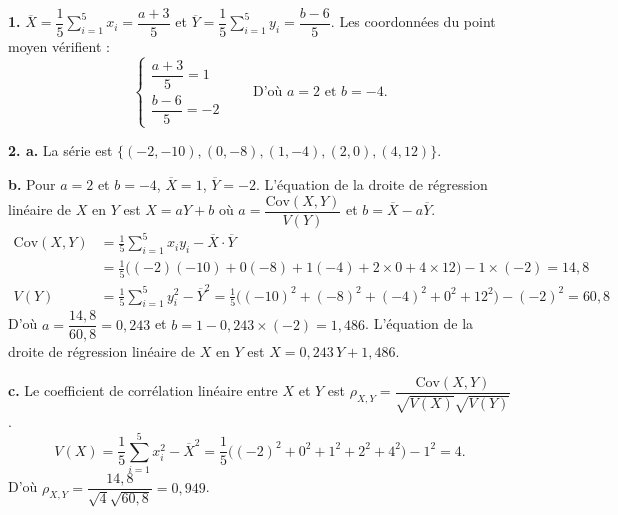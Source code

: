 \documentclass[11pt]{article}
\begin{document}


\textbf{1.} $\overline{X} = \dfrac{1}{5}\displaystyle\sum_{i=1}^5 x_i = \dfrac{a + 3}{5}$ et $\overline{Y} = \dfrac{1}{5}\displaystyle\sum_{i=1}^5 y_i = \dfrac{b - 6}{5}$. Les coordonnées du point moyen vérifient :
\[ \begin{cases} \dfrac{a + 3}{5} = 1 \\[1ex] \dfrac{b - 6}{5} = -2 \end{cases} \qquad \text{D'où } a = 2 \text{ et } b = -4. \]

\textbf{2. a.} La série est $\{(-2, -10), (0, -8), (1, -4), (2, 0), (4, 12)\}$.
\begin{center}
\end{center}

\textbf{b.} Pour $a = 2$ et $b = -4$, $\overline{X} = 1$, $\overline{Y} = -2$. L'équation de la droite de régression linéaire de $X$ en $Y$ est $X = aY + b$ où $a = \dfrac{\mathrm{Cov}(X, Y)}{V(Y)}$ et $b = \overline{X} - a\overline{Y}$.
\begin{align*}
\mathrm{Cov}(X, Y) &= \frac{1}{5}\sum_{i=1}^5 x_i y_i - \overline{X}\cdot\overline{Y} \\
&= \frac{1}{5}\big((-2)(-10) + 0(-8) + 1(-4) + 2 \times 0 + 4 \times 12\big) - 1 \times (-2) = 14{,}8 \\
V(Y) &= \frac{1}{5}\sum_{i=1}^5 y_i^2 - \overline{Y}^2 = \frac{1}{5}\big((-10)^2 + (-8)^2 + (-4)^2 + 0^2 + 12^2\big) - (-2)^2 = 60{,}8
\end{align*}
D'où $a = \dfrac{14{,}8}{60{,}8} = 0{,}243$ et $b = 1 - 0{,}243 \times (-2) = 1{,}486$. L'équation de la droite de régression linéaire de $X$ en $Y$ est $X = 0{,}243\,Y + 1{,}486$.

\textbf{c.} Le coefficient de corrélation linéaire entre $X$ et $Y$ est $\rho_{X,Y} = \dfrac{\mathrm{Cov}(X, Y)}{\sqrt{V(X)}\sqrt{V(Y)}}$.
\[ V(X) = \frac{1}{5}\sum_{i=1}^5 x_i^2 - \overline{X}^2 = \frac{1}{5}\big((-2)^2 + 0^2 + 1^2 + 2^2 + 4^2\big) - 1^2 = 4. \]
D'où $\rho_{X,Y} = \dfrac{14{,}8}{\sqrt{4}\sqrt{60{,}8}} = 0{,}949$.
\end{document}
